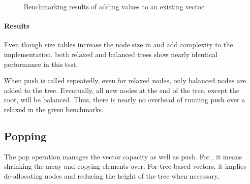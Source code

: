 \begin{figure}[!htbp]
\begin{adjustbox}{width=\textwidth}
    \end{adjustbox}

    \caption{Benchmarking results of adding values to an existing vector}
    \label{fig:push-existing}
\end{figure}

\paragraph{Results}
Even though size tables increase the node size in \rrbtree{} and add complexity to the implementation, both relaxed and balanced trees show nearly identical performance in this test.

When push is called repeatedly, even for relaxed nodes, only balanced nodes are added to the tree. Eventually, all new nodes at the end of the tree, except the root, will be balanced. Thus, there is nearly no overhead of running push over a relaxed \rrbvec{} in the given benchmarks.

\subsection{Popping}
The pop operation manages the vector capacity as well as push. For \stdvec{}, it means shrinking the array and copying elements over. For tree-based vectors, it implies de-allocating nodes and reducing the height of the tree when necessary.

